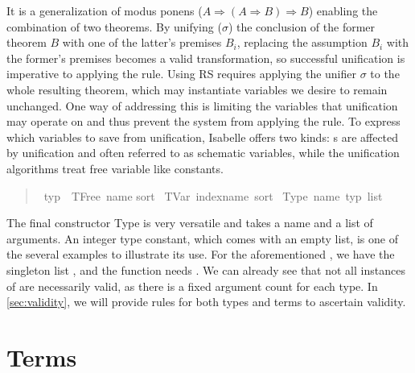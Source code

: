It is a generalization of modus ponens (\(A \Longrightarrow (A \Longrightarrow B) \Longrightarrow B\)) enabling the combination of two theorems.
By unifying (\(\sigma\)) the conclusion of the former theorem \(B\) with one of the latter's premises \(B_i\), replacing the assumption \(B_i\) with the former's premises becomes a valid transformation, so successful unification is imperative to applying the rule.
Using RS requires applying the unifier \(\sigma\) to the whole resulting theorem, which may instantiate variables we desire to remain unchanged.
One way of addressing this is limiting the variables that unification may operate on and thus prevent the system from applying the rule.
To express which variables to save from unification, Isabelle offers two kinds:
s are affected by unification and often referred to as schematic variables, while the unification algorithms treat free variable  like constants.


\begin{quote}
    \begin{isabelle}
        \ typ\ {\isacharequal}\ TFree\ name sort\isanewline
        \isaindent{\ \ }{\isacharbar}\ TVar\ indexname\ sort\isanewline
        \isaindent{\ \ }{\isacharbar}\ Type\ name\ {\isacharparenleft}typ\ list{\isacharparenright}
    \end{isabelle}
\end{quote}

The final constructor Type is very versatile and takes a name and a list of arguments.
An integer type constant, which comes with an empty list, is one of the several examples to illustrate its use.
For the aforementioned , we have the singleton list \isa{[\(\alpha\)]}, and the function \isa{\(\alpha\) \isasymRightarrow\ \(\beta\)} needs \isa{[\(\alpha\), \(\beta\)]}.
We can already see that not all instances of  are necessarily valid, as there is a fixed argument count for each type.
In \autoref{sec:validity}, we will provide rules for both types and terms to ascertain validity.

\section{Terms}

